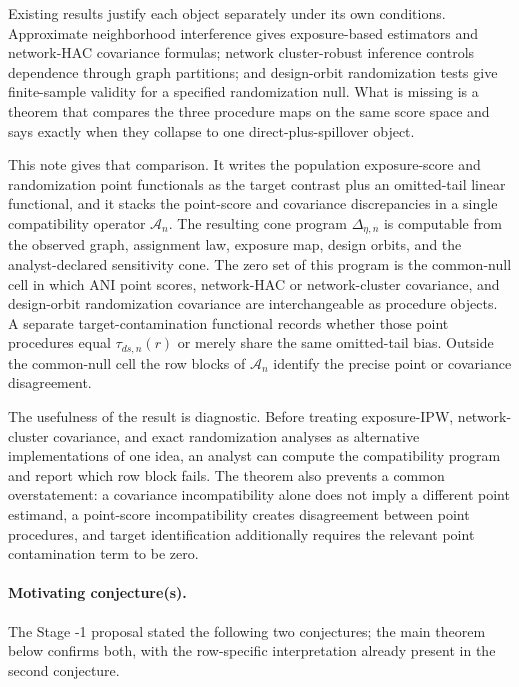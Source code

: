 \documentclass[11pt]{article}
\theoremstyle{definition}
\theoremstyle{plain}
\theoremstyle{remark}
\begin{document}
Existing results justify each object separately under its own conditions.
Approximate neighborhood interference gives exposure-based estimators and
network-HAC covariance formulas; network cluster-robust inference controls
dependence through graph partitions; and design-orbit randomization tests give
finite-sample validity for a specified randomization null.  What is missing is
a theorem that compares the three procedure maps on the same score space and
says exactly when they collapse to one direct-plus-spillover object.

This note gives that comparison.  It writes the population exposure-score and
randomization point functionals as the target contrast plus an omitted-tail
linear functional, and it stacks the point-score and covariance discrepancies
in a single compatibility operator \(\mathcal A_n\).  The resulting cone
program \(\Delta_{\eta,n}\) is computable from the observed graph, assignment
law, exposure map, design orbits, and the analyst-declared sensitivity cone.
The zero set of this program is the common-null cell in which ANI point scores,
network-HAC or network-cluster covariance, and design-orbit randomization
covariance are interchangeable as procedure objects.  A separate
target-contamination functional records whether those point procedures equal
\(\tau_{ds,n}(r)\) or merely share the same omitted-tail bias.  Outside the
common-null cell the row blocks of \(\mathcal A_n\) identify the precise
point or covariance disagreement.

The usefulness of the result is diagnostic.  Before treating exposure-IPW,
network-cluster covariance, and exact randomization analyses as alternative
implementations of one idea, an analyst can compute the compatibility program
and report which row block fails.  The theorem also prevents a common
overstatement: a covariance incompatibility alone does not imply a different
point estimand, a point-score incompatibility creates disagreement between
point procedures, and target identification additionally requires the relevant
point contamination term to be zero.

\paragraph{Motivating conjecture(s).}
The Stage -1 proposal stated the following two conjectures; the main theorem
below confirms both, with the row-specific interpretation already present in
the second conjecture.
\end{document}
